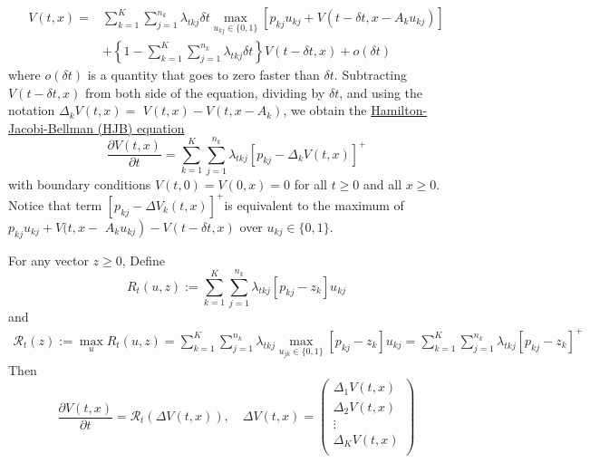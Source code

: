 \documentclass[11pt,a4paper]{article}
\begin{document}
$$
\begin{aligned}
V(t, x)=& \sum_{k=1}^{K} \sum_{j=1}^{n_{k}} \lambda_{t k j} \delta t \max _{u_{k j} \in\{0,1\}}\left[p_{k j} u_{k j}+V\left(t-\delta t, x-A_{k} u_{k j}\right)\right] \\
&+\left\{1-\sum_{k=1}^{K} \sum_{j=1}^{n_{k}} \lambda_{t k j} \delta t\right\} V(t-\delta t, x)+o(\delta t)
\end{aligned}
$$
where $o(\delta t)$ is a quantity that goes to zero faster than $\delta t$. Subtracting $V(t-\delta t, x)$ from both side of the equation, dividing by $\delta t$, and using the notation $\Delta_{k} V(t, x)=$ $V(t, x)-V\left(t, x-A_{k}\right)$, we obtain the \underline{Hamilton-Jacobi-Bellman (HJB) equation}
$$
\frac{\partial V(t, x)}{\partial t}=\sum_{k=1}^{K} \sum_{j=1}^{n_{k}} \lambda_{t k j}\left[p_{k j}-\Delta_{k} V(t, x)\right]^{+}
$$
with boundary conditions $V(t, 0)=V(0, x)=0$ for all $t \geq 0$ and all $x \geq 0$. Notice that term $\left[p_{k j}-\Delta V_{k}(t, x)\right]^{+}$is equivalent to the maximum of $p_{k j} u_{k j}+V(t, x-$ $\left.A_{k} u_{k j}\right)-V(t-\delta t, x)$ over $u_{k j} \in\{0,1\} .$

For any vector $z \geq 0$, Define
$$
R_{t}(u, z):=\sum_{k=1}^{K} \sum_{j=1}^{n_{k}} \lambda_{t k j}\left[p_{k j}-z_{k}\right] u_{k j}
$$
and
$$
\begin{aligned}
\mathcal{R}_{t}(z):=\max _{u} R_{t}(u, z)=\sum_{k=1}^{K} \sum_{j=1}^{n_{k}} \lambda_{t k j} \max _{u_{j k} \in\{0,1\}}\left[p_{k j}-z_{k}\right] u_{k j}=\sum_{k=1}^{K} \sum_{j=1}^{n_{k}} \lambda_{t k j}\left[p_{k j}-z_{k}\right]^{+}
\end{aligned}
$$
Then $$
\frac{\partial V(t, x)}{\partial t}=\mathcal{R}_{t}(\Delta V(t, x)),\quad \Delta V(t, x)=\begin{pmatrix}
    \Delta_{1} V(t, x)\\
    \Delta_{2} V(t, x)\\
    \vdots\\
    \Delta_{K} V(t, x)\\
\end{pmatrix}
$$
\end{document}
